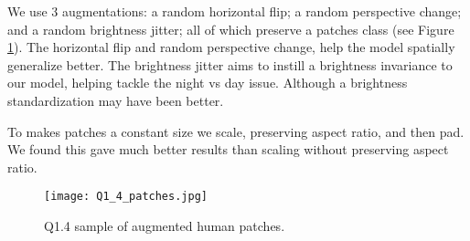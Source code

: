 We use 3 augmentations: a random horizontal flip; a random perspective change; and a random brightness jitter; all of which preserve a patches class (see Figure \ref{fig:Q1_4}).
The horizontal flip and random perspective change, help the model spatially generalize better.
The brightness jitter aims to instill a brightness invariance to our model, helping tackle the night vs day issue.
Although a brightness standardization may have been better.

To makes patches a constant size we scale, preserving aspect ratio, and then pad.
We found this gave much better results than scaling without preserving aspect ratio.

\begin{figure}[h!]
  \begin{center}
  \texttt{[image: Q1\_4\_patches.jpg]}
    \caption{Q1.4 sample of augmented human patches.}
    \label{fig:Q1_4}
  \end{center}
  \end{figure}